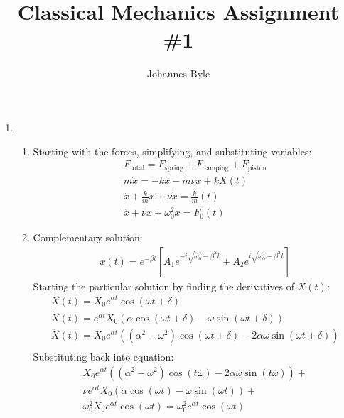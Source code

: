 \documentclass[12pt]{article}
\title{Classical Mechanics Assignment \#1}
\author{Johannes Byle}
\begin{document}
    \maketitle
    \begin{enumerate}
        \item
        \begin{enumerate}
            \item
            Starting with the forces, simplifying, and substituting variables:
            \begin{gather*}
                F_{\text{total}}=F_{\text{spring}}+F_{\text{damping}}+F_{\text{piston}}\\
                m\ddot{x}=-kx-m\nu\dot{x}+kX(t)\\
                \ddot{x}+\frac{k}{m}x+\nu\dot{x}=\frac{k}{m}(t)\\
                \ddot{x}+\nu\dot{x}+\omega_0^2 x=F_0(t)
            \end{gather*}
            \item
            Complementary solution:
            \begin{gather*}
                x(t)=e^{-\beta t}\left[A_1 e^{-i\sqrt{\omega_0^2-\beta^2}t}+A_2 e^{i\sqrt{\omega_0^2-\beta^2}t}\right]
            \end{gather*}
            Starting the particular solution by finding the derivatives of $X(t)$:
            \begin{gather*}
                X(t)=X_0 e^{\alpha t}\cos(\omega t+\delta)\\
                \dot{X}(t)=e^{\alpha t}X_0\left(\alpha\cos(\omega t+\delta)-\omega\sin(\omega t+\delta)\right)\\
                \ddot{X}(t)=X_0 e^{\alpha t} \left(\left(\alpha^2-\omega^2\right) \cos (\omega t+\delta)-2 \alpha \omega \sin (\omega t+\delta)\right)\\
            \end{gather*}
            Substituting back into equation:
            \begin{gather*}
                X_0 e^{\alpha t} \left(\left(\alpha^2-\omega^2\right) \cos (t \omega)-2 \alpha \omega \sin (t \omega)\right)+\\
                \nu e^{\alpha t}X_0\left(\alpha\cos(\omega t)-\omega\sin(\omega t)\right)+\\
                \omega_0^2 X_0 e^{\alpha t}\cos(\omega t)=\omega_0^2 e^{\alpha t}\cos(\omega t)\\
            \end{gather*}

\end{enumerate}
\end{enumerate}
\end{document}
